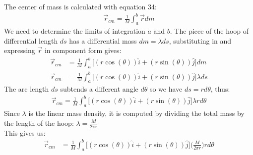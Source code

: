 \documentclass[a4paper]{article}
\def\centerarc[#1](#2)(#3:#4:#5){\draw[#1] ($(#2)+({#5*cos(#3)},{#5*sin(#3)})$) arc (#3:#4:#5)}
\begin{document}
\begin{shaded}
\begin{center}
    \end{center}
    The center of mass is calculated with equation 34:
    \begin{align*}
        \displaystyle \vec{r}_{cm} = \frac{1}{M} \int_{a}^{b}\vec{r}dm 
    \end{align*}
    We need to determine the limits of integration $a$ and $b$. The piece of the hoop of differential length $ds$ has a differential mass $dm = \lambda ds$, substituting in and expressing $\vec{r}$ in component form gives:
    \begin{align*}
        \vec{r}_{cm} &= \frac{1}{M}\int_{a}^{b} \Big[(r\cos(\theta))\hat{i} + (r\sin(\theta))\hat{j}\Big]dm\\
        \vec{r}_{cm} &= \frac{1}{M}\int_{a}^{b} \Big[(r\cos(\theta))\hat{i} + (r\sin(\theta))\hat{j}\Big]\lambda ds
    \end{align*}
    The arc length $ds$ subtends a different angle $d\theta$ so we have $ds = rd\theta$, thus:
    \begin{align*}
        \vec{r}_{cm} = \frac{1}{M}\int_{a}^{b} \Big[(r\cos(\theta))\hat{i} + (r\sin(\theta))\hat{j}\Big]\lambda rd\theta
    \end{align*}
    Since $\lambda$ is the linear mass density, it is computed by dividing the total mass by the length of the hoop: $\displaystyle \lambda = \frac{M}{2\pi r}$\\
    This gives us:
    \begin{align*}
        \vec{r}_{cm} &= \frac{1}{M}\int_{a}^{b} \Big[(r\cos(\theta))\hat{i} + (r\sin(\theta))\hat{j}\Big]\bigg(\frac{M}{2\pi r}\bigg) rd\theta\\

\end{align*}
\end{shaded}
\end{document}
